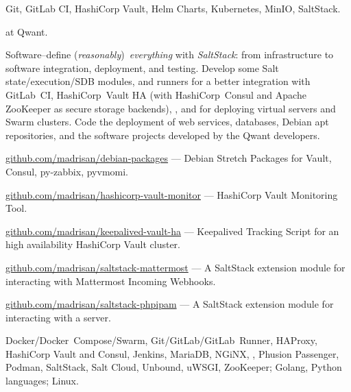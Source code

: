 \smallskip\noindent
\technologies
Git, GitLab CI, HashiCorp Vault, Helm Charts, Kubernetes, MinIO, SaltStack.




 at Qwant.

\smallskip\noindent
\tasks
Software--define ({\it reasonably}\/)~{\it everything\/} with {\it SaltStack\/}:
from infrastructure to software integration, deployment, and testing.
Develop some Salt state/execution/SDB modules, and runners for a better
integration with GitLab~CI, HashiCorp~Vault HA (with HashiCorp~Consul and
Apache ZooKeeper as secure storage backends), \phpIPAM{}, and for deploying
virtual servers and Swarm clusters.
Code the deployment of web services, databases, Debian apt repositories, and the
software projects developed by the Qwant developers.

\smallskip\noindent
\software
\url{github.com/madrisan/debian-packages} ---
Debian Stretch Packages for Vault, Consul, py-zabbix, pyvmomi.

\noindent
\url{github.com/madrisan/hashicorp-vault-monitor} ---
HashiCorp Vault Monitoring Tool.

\noindent
\url{github.com/madrisan/keepalived-vault-ha} ---
Keepalived Tracking Script for an high availability HashiCorp Vault cluster.

\noindent
\url{github.com/madrisan/saltstack-mattermost} ---
A SaltStack extension module for interacting with Mattermost Incoming Webhooks.

\noindent
\url{github.com/madrisan/saltstack-phpipam} ---
A SaltStack extension module for interacting with a \phpIPAM{} server.


\smallskip\noindent
\technologies
Docker/Docker~Compose/Swarm, Git/GitLab/GitLab~Runner, HAProxy,
HashiCorp Vault and Consul, Jenkins, MariaDB, NGiNX, \phpIPAM,
Phusion Passenger, Podman, SaltStack, Salt Cloud, Unbound, uWSGI, ZooKeeper;
Golang, Python languages; Linux.




